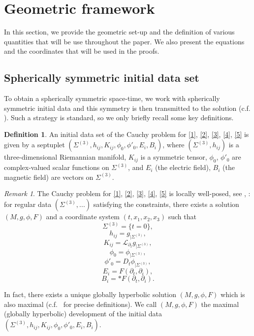 \documentclass[10pt,a4paper]{article}
\theoremstyle{plain}
\theoremstyle{remark}
\newtheorem{rmk}{Remark}[section]
\theoremstyle{definition}
\newtheorem{defn}{Definition}[section]
\theoremstyle{plain}
\theoremstyle{remark}
\theoremstyle{definition}
\numberwithin{equation}{section}
\begin{document}
\section{Geometric framework} \label{geometricframework}


In this section, we provide the geometric set-up and the definition of various quantities that will be use throughout the paper. We also present the equations and the coordinates that will be used in the proofs.















\subsection{Spherically symmetric initial data set} \label{sphericallysymdatasection}

To obtain a spherically symmetric space-time, we work with spherically symmetric initial data and this symmetry is then transmitted to the solution (c.f. \cite{Kommemi}). Such a strategy is standard, so we only briefly recall some key definitions. 

\begin{defn}
	An initial data set of the Cauchy problem for \eqref{1}, \eqref{2}, \eqref{3}, \eqref{4}, \eqref{5} is given by a septuplet $(\Sigma^{(3)},h_{i j}, K_{i j}, \phi_0, \phi'_0, E_i, B_i)$, where $(\Sigma^{(3)},h_{i j})$ is a three-dimensional Riemannian manifold, $ K_{i j}$ is a symmetric tensor, $\phi_0$, $\phi'_0$ are complex-valued scalar functions on $\Sigma^{(3)}$, and $E_i$ (the electric field), $B_i$ (the magnetic field) are vectors on $\Sigma^{(3)}$.
\end{defn}
\begin{rmk}
	The Cauchy problem for \eqref{1}, \eqref{2}, \eqref{3}, \eqref{4}, \eqref{5} is locally well-posed, see \cite{Kommemi}, \cite{MGHD}: for regular data $(\Sigma^{(3)}, ...)$ satisfying the constraints, there exists a solution $(M,g,\phi,F)$ and a coordinate system $(t,x_1,x_2,x_3)$ such that $$\Sigma^{(3)}= \{t=0\},$$ $$h_{i j}= g_{ | \Sigma^{(3)}},$$ $$K_{i j}=  \mathcal{L}_{\partial_t}  g_{ | \Sigma^{(3)}},$$ $$ \phi_0 = \phi_{| \Sigma^{(3)}}, $$ $$ \phi'_0 = D_t \phi_{| \Sigma^{(3)}}, $$$$E_{i}=  F(\partial_t, \partial_i),$$ $$B_{i}=  *F(\partial_t, \partial_i).$$
\end{rmk}
In fact, there exists a unique globally hyperbolic solution $(M,g,\phi,F)$ which is also maximal (c.f.\ \cite{MGHD} for precise definitions). We call $(M,g,\phi,F)$ the maximal (globally hyperbolic) development of the initial data $(\Sigma^{(3)},h_{i j}, K_{i j}, \phi_0, \phi'_0, E_i, B_i)$.
\end{document}
